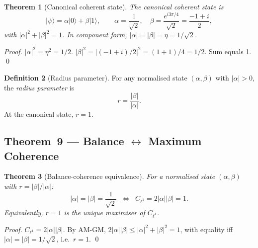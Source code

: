 \documentclass[12pt,a4paper]{article}
\theoremstyle{plain}
\newtheorem{theorem}{Theorem}[section]
\theoremstyle{definition}
\newtheorem{definition}[theorem]{Definition}
\theoremstyle{remark}
\newcommand{\ket}[1]{\lvert #1 \rangle}
\newcommand{\abs}[1]{\lvert #1 \rvert}
\begin{document}
\begin{theorem}[Canonical coherent state]\label{thm:8}
  The \emph{canonical coherent state} is
  \begin{equation}
    \ket{\psi} = \alpha\ket{0} + \beta\ket{1},\qquad
    \alpha = \frac{1}{\sqrt{2}},\quad
    \beta  = \frac{e^{i3\pi/4}}{\sqrt{2}} = \frac{-1+i}{2},
    \label{eq:canonical}
  \end{equation}
  with $\abs{\alpha}^2+\abs{\beta}^2=1$.  In component form,
  $\abs{\alpha}=\abs{\beta}=\eta=1/\sqrt{2}$.
\end{theorem}

\begin{proof}
  $\abs{\alpha}^2 = \eta^2 = 1/2$.
  $\abs{\beta}^2 = \abs{(-1+i)/2}^2 = (1+1)/4 = 1/2$.
  Sum equals 1. \qed
\end{proof}

\begin{definition}[Radius parameter]\label{def:r}
  For any normalised state $(\alpha,\beta)$ with $\abs{\alpha}>0$, the
  \emph{radius parameter} is
  \begin{equation}
    r = \frac{\abs{\beta}}{\abs{\alpha}}.
    \label{eq:radius}
  \end{equation}
  At the canonical state, $r=1$.
\end{definition}

\subsection{Theorem~9 — Balance $\leftrightarrow$ Maximum Coherence}

\begin{theorem}[Balance-coherence equivalence]\label{thm:9}
  For a normalised state $(\alpha,\beta)$ with $r=\abs{\beta}/\abs{\alpha}$:
  \begin{equation}
    \abs{\alpha}=\abs{\beta}=\frac{1}{\sqrt{2}}
    \;\;\Longleftrightarrow\;\;
    C_{\ell^1} = 2\abs{\alpha}\abs{\beta} = 1.
    \label{eq:balance-coherence}
  \end{equation}
  Equivalently, $r=1$ is the \emph{unique} maximiser of $C_{\ell^1}$.
\end{theorem}

\begin{proof}
  $C_{\ell^1} = 2\abs{\alpha}\abs{\beta}$.  By AM-GM,
  $2\abs{\alpha}\abs{\beta} \le \abs{\alpha}^2+\abs{\beta}^2 = 1$,
  with equality iff $\abs{\alpha}=\abs{\beta}=1/\sqrt{2}$, i.e.\ $r=1$. \qed
\end{proof}
\end{document}
